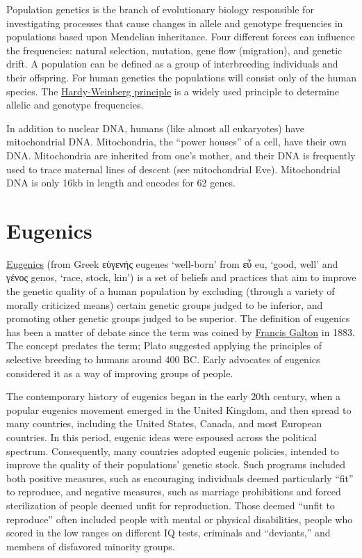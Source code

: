 Population genetics is the branch of evolutionary biology responsible for investigating processes that cause changes in allele and genotype frequencies in populations based upon Mendelian inheritance. Four different forces can influence the frequencies: natural selection, mutation, gene flow (migration), and genetic drift. A population can be defined as a group of interbreeding individuals and their offspring. For human genetics the populations will consist only of the human species. The \href{https://en.wikipedia.org/wiki/Hardy–Weinberg_principle}{Hardy-Weinberg principle} is a widely used principle to determine allelic and genotype frequencies.

In addition to nuclear DNA, humans (like almost all eukaryotes) have mitochondrial DNA. Mitochondria, the ``power houses'' of a cell, have their own DNA. Mitochondria are inherited from one's mother, and their DNA is frequently used to trace maternal lines of descent (see mitochondrial Eve). Mitochondrial DNA is only 16kb in length and encodes for 62 genes.

\hypertarget{eugenics}{%
\section{Eugenics}\label{eugenics}}

\href{https://en.wikipedia.org/wiki/Eugenics}{Eugenics} (from Greek εὐγενής eugenes `well-born' from εὖ eu, `good, well' and γένος genos, `race, stock, kin') is a set of beliefs and practices that aim to improve the genetic quality of a human population by excluding (through a variety of morally criticized means) certain genetic groups judged to be inferior, and promoting other genetic groups judged to be superior. The definition of eugenics has been a matter of debate since the term was coined by \href{https://en.wikipedia.org/wiki/Francis_Galton}{Francis Galton} in 1883. The concept predates the term; Plato suggested applying the principles of selective breeding to humans around 400 BC. Early advocates of eugenics considered it as a way of improving groups of people.

The contemporary history of eugenics began in the early 20th century, when a popular eugenics movement emerged in the United Kingdom, and then spread to many countries, including the United States, Canada, and most European countries. In this period, eugenic ideas were espoused across the political spectrum. Consequently, many countries adopted eugenic policies, intended to improve the quality of their populations' genetic stock. Such programs included both positive measures, such as encouraging individuals deemed particularly ``fit'' to reproduce, and negative measures, such as marriage prohibitions and forced sterilization of people deemed unfit for reproduction. Those deemed ``unfit to reproduce'' often included people with mental or physical disabilities, people who scored in the low ranges on different IQ tests, criminals and ``deviants,'' and members of disfavored minority groups.

